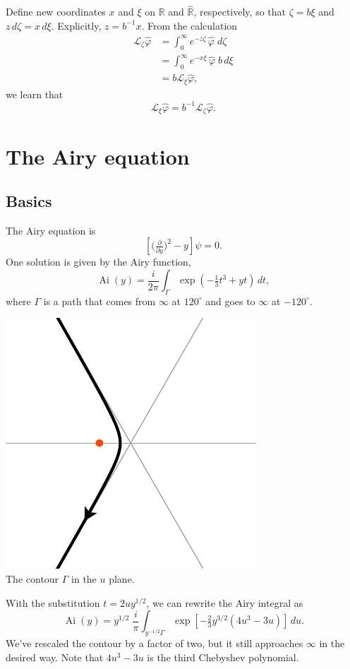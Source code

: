 \documentclass{article}
\newcommand{\R}{\mathbb{R}}
\newcommand{\laplace}{\mathcal{L}}
\DeclareMathOperator{\Ai}{Ai}
\begin{document}
Define new coordinates $x$ and $\xi$ on $\R$ and $\hat{\R}$, respectively, so that $\zeta = b\xi$ and $z\,d\zeta = x\,d\xi$. Explicitly, $z = b^{-1}x$. From the calculation
\begin{align*}
\laplace_\zeta \hat{\varphi} & = \int_0^\infty e^{-z \zeta}\,\hat{\varphi}\;d\zeta \\
& = \int_0^\infty e^{-x\xi}\,\hat{\varphi}\;b\,d\xi \\
& = b \laplace_\xi \hat{\varphi},
\end{align*}
we learn that
\[ \laplace_\xi \hat{\varphi} = b^{-1} \laplace_\zeta \hat{\varphi}. \]
\section{The Airy equation}
\subsection{Basics}
The Airy equation is
\begin{equation}\label{eqn:airy}
\left[\big(\tfrac{\partial}{\partial y}\big)^2 - y\right] \psi = 0.
\end{equation}
One solution is given by the Airy function,
\[ \Ai(y) = \frac{i}{2\pi} \int_{\Gamma} \exp\left(-\tfrac{1}{3}t^3 + yt\right)\,dt, \]
where $\Gamma$ is a path that comes from $\infty$ at $120^\circ$ and goes to $\infty$ at $-120^\circ$.
\begin{center}
\includegraphics{figures/u_contour.pdf} \\[1em]
{\small The contour $\Gamma$ in the $u$ plane.}
\end{center}
With the substitution $t = 2uy^{1/2}$, we can rewrite the Airy integral as
\[ \Ai(y) = y^{1/2}\;\frac{i}{\pi} \int_{y^{-1/2} \Gamma} \exp\left[-\tfrac{2}{3}y^{3/2} \left(4u^3 - 3u\right)\right]\,du. \]
We've rescaled the contour by a factor of two, but it still approaches $\infty$ in the desired way. Note that $4u^3 - 3u$ is the third Chebyshev polynomial.
\end{document}
